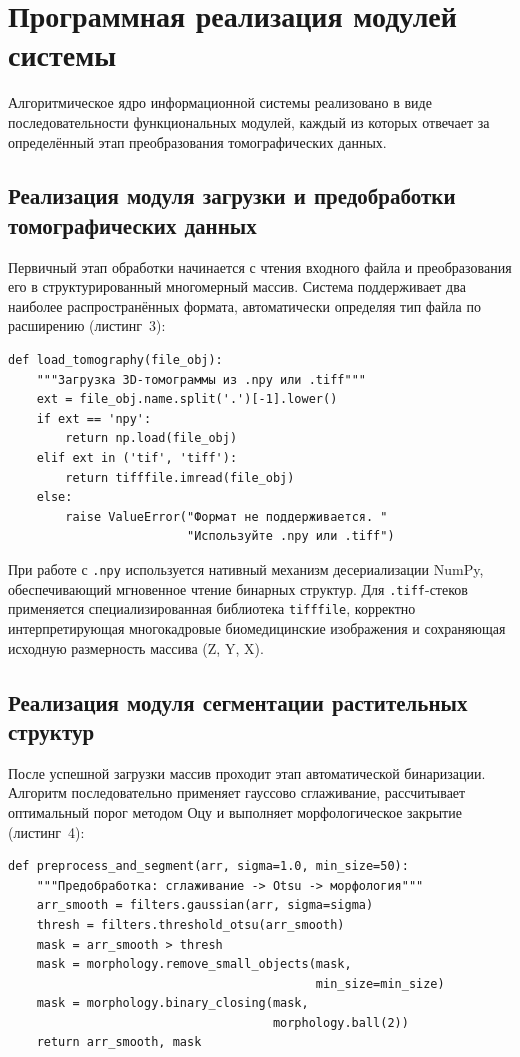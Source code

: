 \documentclass[14pt,a4paper]{extreport}
\begin{document}
\section{Программная реализация модулей системы}

Алгоритмическое ядро информационной системы реализовано в виде последовательности функциональных модулей, каждый из которых отвечает за определённый этап преобразования томографических данных.

\subsection{Реализация модуля загрузки и предобработки томографических данных}

Первичный этап обработки начинается с чтения входного файла и преобразования его в структурированный многомерный массив. Система поддерживает два наиболее распространённых формата, автоматически определяя тип файла по расширению (листинг~3):

\begin{lstlisting}[caption={Функция загрузки и валидации томографических данных}]
def load_tomography(file_obj):
    """Загрузка 3D-томограммы из .npy или .tiff"""
    ext = file_obj.name.split('.')[-1].lower()
    if ext == 'npy':
        return np.load(file_obj)
    elif ext in ('tif', 'tiff'):
        return tifffile.imread(file_obj)
    else:
        raise ValueError("Формат не поддерживается. "
                         "Используйте .npy или .tiff")
\end{lstlisting}

При работе с \texttt{.npy} используется нативный механизм десериализации NumPy, обеспечивающий мгновенное чтение бинарных структур. Для \texttt{.tiff}-стеков применяется специализированная библиотека \texttt{tifffile}, корректно интерпретирующая многокадровые биомедицинские изображения и сохраняющая исходную размерность массива (Z, Y, X).

\subsection{Реализация модуля сегментации растительных структур}

После успешной загрузки массив проходит этап автоматической бинаризации. Алгоритм последовательно применяет гауссово сглаживание, рассчитывает оптимальный порог методом Оцу и выполняет морфологическое закрытие (листинг~4):

\begin{lstlisting}[caption={Алгоритм автоматической сегментации воксельного массива}]
def preprocess_and_segment(arr, sigma=1.0, min_size=50):
    """Предобработка: сглаживание -> Otsu -> морфология"""
    arr_smooth = filters.gaussian(arr, sigma=sigma)
    thresh = filters.threshold_otsu(arr_smooth)
    mask = arr_smooth > thresh
    mask = morphology.remove_small_objects(mask,
                                           min_size=min_size)
    mask = morphology.binary_closing(mask,
                                     morphology.ball(2))
    return arr_smooth, mask
\end{lstlisting}
\end{document}
